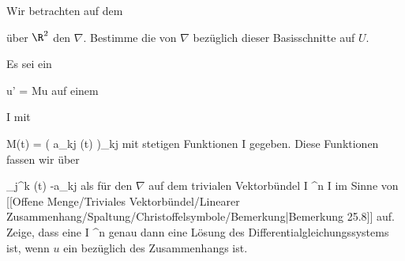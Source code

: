 {}
{

Wir betrachten auf dem

 über $\R^2$ den
$\nabla$.
 {Bestimme die
von $\nabla$ bezüglich dieser Basisschnitte auf $U$.
}

}
{} {}

{}
{

Es sei ein

\mavergleichskettedisp
{\vergleichskette
{ u'
}
{ =} { Mu
}
{ } {
}
{ } {
}
{ } {
}
}
{}{}{}
auf einem

\mavergleichskette
{\vergleichskette
{ I
}
{ \subseteq }{ \R
}
{  }{
}
{    }{
}
{   }{
}
}
{}{}{}
mit

\mavergleichskettedisp
{\vergleichskette
{ M(t)
}
{ =} { \left(  a_{kj} (t)  \right)_{kj}
}
{ } {
}
{ } {
}
{ } {
}
}
{}{}{}
 {} {}
mit stetigen Funktionen
 { I } {\R
} {}
gegeben. Diese Funktionen fassen wir über

\mavergleichskettedisp
{\vergleichskette
{ \Gamma_{j}^k (t)
}
{ } { -a_{kj}
}
{ } {
}
{ } {
}
{ } {
}
}
{}{}{}
als
 {} {}
für den
$\nabla$ auf dem trivialen Vektorbündel
 {I \times \R^n } { I
} {}
im Sinne von
[[Offene Menge/Triviales Vektorbündel/Linearer Zusammenhang/Spaltung/Christoffelsymbole/Bemerkung|Bemerkung 25.8]]
auf. Zeige, dass eine
 { I } { \R^n
} {}
genau dann eine Lösung des Differentialgleichungssystems ist, wenn $u$ ein
bezüglich des Zusammenhangs ist.

}
{} {}

